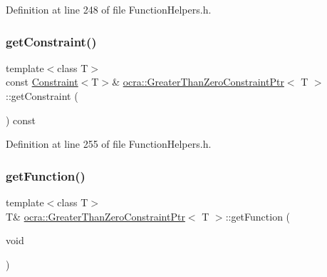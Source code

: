 Definition at line 248 of file Function\+Helpers.\+h.

\hypertarget{classocra_1_1GreaterThanZeroConstraintPtr_ab664e8f3cc1d697efbb97d3306ace309}{}\label{classocra_1_1GreaterThanZeroConstraintPtr_ab664e8f3cc1d697efbb97d3306ace309} 
\subsubsection{\texorpdfstring{get\+Constraint()}{getConstraint()}\hspace{0.1cm}{\footnotesize\ttfamily [2/2]}}
{\footnotesize\ttfamily template$<$class T$>$ \\
const \hyperlink{classocra_1_1Constraint}{Constraint}$<$T$>$\& \hyperlink{classocra_1_1GreaterThanZeroConstraintPtr}{ocra\+::\+Greater\+Than\+Zero\+Constraint\+Ptr}$<$ T $>$\+::get\+Constraint (\begin{DoxyParamCaption}{ }\end{DoxyParamCaption}) const\hspace{0.3cm}{\ttfamily [inline]}}



Definition at line 255 of file Function\+Helpers.\+h.

\hypertarget{classocra_1_1GreaterThanZeroConstraintPtr_a08864214cedd5b05f5318f29a941693d}{}\label{classocra_1_1GreaterThanZeroConstraintPtr_a08864214cedd5b05f5318f29a941693d} 
\subsubsection{\texorpdfstring{get\+Function()}{getFunction()}\hspace{0.1cm}{\footnotesize\ttfamily [1/2]}}
{\footnotesize\ttfamily template$<$class T$>$ \\
T\& \hyperlink{classocra_1_1GreaterThanZeroConstraintPtr}{ocra\+::\+Greater\+Than\+Zero\+Constraint\+Ptr}$<$ T $>$\+::get\+Function (\begin{DoxyParamCaption}\item[{void}]{ }\end{DoxyParamCaption})\hspace{0.3cm}{\ttfamily [inline]}}



